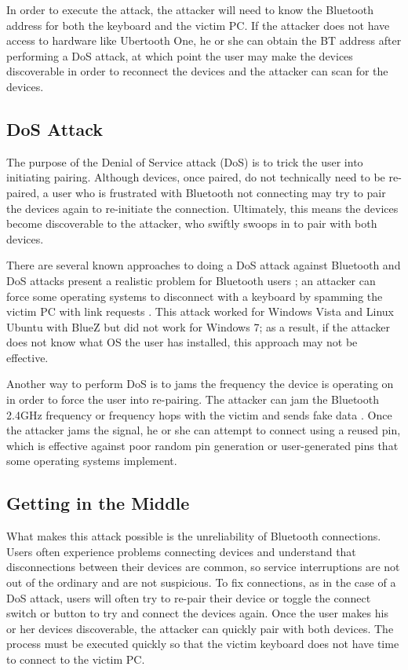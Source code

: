 \documentclass{acm_proc_article-sp}
\begin{document}
In order to execute the attack, the attacker will need to know the Bluetooth address for both the keyboard and the victim PC. If the attacker does not have access to hardware like Ubertooth One, he or she can obtain the BT address after performing a DoS attack, at which point the user may make the devices discoverable in order to reconnect the devices and the attacker can scan for the devices. 

\subsection{DoS Attack}
The purpose of the Denial of Service attack (DoS) is to trick the user into initiating pairing. Although devices, once paired, do not technically need to be re-paired, a user who is frustrated with Bluetooth not connecting may try to pair the devices again to re-initiate the connection. Ultimately, this means the devices become discoverable to the attacker, who swiftly swoops in to pair with both devices. 

There are several known approaches to doing a DoS attack against Bluetooth and DoS attacks present a realistic problem for Bluetooth users \cite{bandyopadhyay2010information}; an attacker can force some operating systems to disconnect with a keyboard by spamming the victim PC with link requests \cite{cuthbertbluetooth}. This attack worked for Windows Vista and Linux Ubuntu with BlueZ but did not work for Windows 7; as a result, if the attacker does not know what OS the user has installed, this approach may not be effective. 

Another way to perform DoS is to jams the frequency the device is operating on in order to force the user into re-pairing. The attacker can jam the Bluetooth 2.4GHz frequency or frequency hops with the victim and sends fake data \cite{4401672}. Once the attacker jams the signal, he or she can attempt to connect using a reused pin\cite{barnickel2012implementing}, which is effective against poor random pin generation or user-generated pins that some operating systems implement. 

\subsection{Getting in the Middle}
What makes this attack possible is the unreliability of Bluetooth connections. Users often experience problems connecting devices and understand that disconnections between their devices are common, so service interruptions are not out of the ordinary and are not suspicious. To fix connections, as in the case of a DoS attack, users will often try to re-pair their device or toggle the connect switch or button to try and connect the devices again. Once the user makes his or her devices discoverable, the attacker can quickly pair with both devices. The process must be executed quickly so that the victim keyboard does not have time to connect to the victim PC. 
\end{document}
